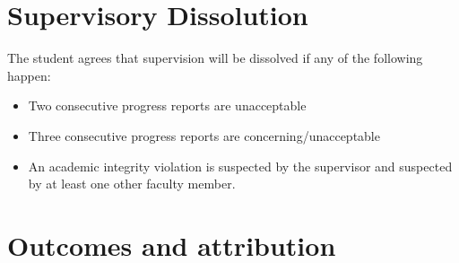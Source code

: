 \documentclass[12pt]{article}
\begin{document}
	\section{Supervisory Dissolution}
	The student agrees that supervision will be dissolved if any of the following happen:
	\begin{itemize}
	\item Two consecutive progress reports are unacceptable
	\item Three consecutive progress reports are concerning/unacceptable
	\item An academic integrity violation is suspected by the supervisor and suspected by at least one other faculty member.
	\end{itemize}
	
	\section{Outcomes and attribution}
	
	
		
	
	
\end{document}
